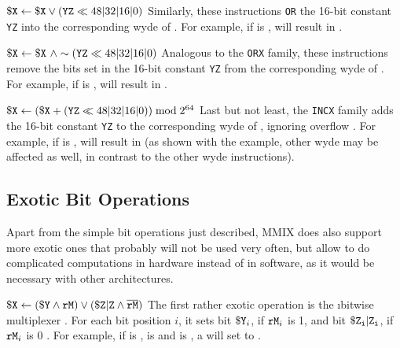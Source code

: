 \instrtbl
	{}
	{${\tt \$X} \leftarrow {\tt \$X} \lor ({\tt YZ} \ll 48|32|16|0)$}
\noindent Similarly, these instructions {\tt OR} the 16-bit constant {\tt YZ} into the corresponding wyde of  \citep[pg. 7]{mmix-doc}. For example, if  is ,  will result in .

\instrtbl
	{}
	{${\tt \$X} \leftarrow {\tt \$X}~\land \sim({\tt YZ} \ll 48|32|16|0)$}
\noindent Analogous to the {\tt ORX} family, these instructions remove the bits set in the 16-bit constant {\tt YZ} from the corresponding wyde of  \citep[pg. 7]{mmix-doc}. For example, if  is ,  will result in .

\instrtbl
	{}
	{${\tt \$X} \leftarrow ({\tt \$X} + ({\tt YZ} \ll 48|32|16|0)) \bmod 2^{64}$}
\noindent Last but not least, the {\tt INCX} family adds the 16-bit constant {\tt YZ} to the corresponding wyde of , ignoring overflow \citep[pg. 7]{mmix-doc}. For example, if  is ,  will result in  (as shown with the example, other wyde may be affected as well, in contrast to the other wyde instructions).

\subsection{Exotic Bit Operations}

Apart from the simple bit operations just described, MMIX does also support more exotic ones that probably will not be used very often, but allow to do complicated computations in hardware instead of in software, as it would be necessary with other architectures.

\instrtbl
	{}
	{${\tt \$X} \leftarrow ({\tt \$Y} \land {\tt rM}) \lor ({\tt \$Z}{\tt|Z} \land \mathbin{\overline{{\tt rM}}})$}
\noindent The first rather exotic operation is the \i{bitwise multiplexer} . For each bit position $i$, it sets bit ${\tt \$Y}_i$, if ${\tt rM}_i$ is 1, and bit ${\tt \$Z_i}{\tt|Z_i}$, if ${\tt rM}_i$ is 0 \citep[pg. 7]{mmix-doc}. For example, if  is ,  is  and  is , a  will set  to .

